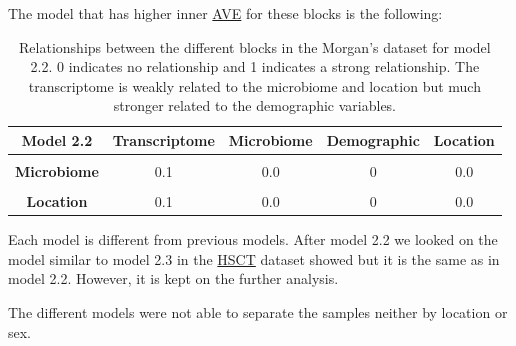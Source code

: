 \documentclass[
  12pt,
  a4paper,
  twoside,
  openright]{book}
\begin{document}
The model that has higher inner \protect\hyperlink{acronyms_AVE}{AVE} for these blocks is the following:

\begin{table}[H]

\caption[Model 2.2 of the Morgan's dataset.]{\label{tab:morgan-model2-2}Relationships between the different blocks in the Morgan's dataset for model 2.2. 0 indicates no relationship and 1 indicates a strong relationship. The transcriptome is weakly related to the microbiome and location but much stronger related to the demographic variables.}
\centering
\begin{tabular}[t]{>{}c|c|c|c|c}
\hline
\textbf{Model 2.2} & \textbf{Transcriptome} & \textbf{Microbiome} & \textbf{Demographic} & \textbf{Location}\\
\hline
\textbf{\cellcolor{gray!6}{Transcriptome}} & \cellcolor{gray!6}{0.0} & \cellcolor{gray!6}{0.1} & \cellcolor{gray!6}{1} & \cellcolor{gray!6}{0.1}\\
\hline
\textbf{Microbiome} & 0.1 & 0.0 & 0 & 0.0\\
\hline
\textbf{\cellcolor{gray!6}{Demographic}} & \cellcolor{gray!6}{1.0} & \cellcolor{gray!6}{0.0} & \cellcolor{gray!6}{0} & \cellcolor{gray!6}{0.0}\\
\hline
\textbf{Location} & 0.1 & 0.0 & 0 & 0.0\\
\hline
\end{tabular}
\end{table}

Each model is different from previous models.
After model 2.2 we looked on the model similar to model 2.3 in the \protect\hyperlink{acronyms_HSCT}{HSCT} dataset showed but it is the same as in model 2.2.
However, it is kept on the further analysis.

The different models were not able to separate the samples neither by location or sex.
\end{document}
